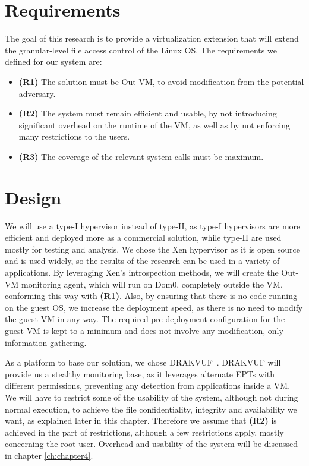 \section{Requirements}\label{sec:requirements}
The goal of this research is to provide a virtualization extension that will extend the granular-level file access control of the Linux \ac{OS}. The requirements we defined for our system are:
\begin{itemize}
	\item \textbf{(R1)} The solution must be Out-VM, to avoid modification from the potential adversary. 
	\item \textbf{(R2)} The system must remain efficient and usable, by not introducing significant overhead on the runtime of the \ac{VM}, as well as by not enforcing many restrictions to the users. 
	\item \textbf{(R3)} The coverage of the relevant system calls must be maximum.
\end{itemize}


\section{Design}\label{sec:design}

\par We will use a type-I hypervisor instead of type-II, as type-I hypervisors are more efficient and deployed more as a commercial solution, while type-II are used mostly for testing and analysis. We chose the Xen hypervisor as it is open source and is used widely, so the results of the research can be used in a variety of applications. By leveraging Xen's introspection methods, we will create the Out-VM monitoring agent, which will run on Dom0, completely outside the \ac{VM}, conforming this way with \textbf{(R1)}. Also, by ensuring that there is no code running on the guest \ac{OS}, we increase the deployment speed, as there is no need to modify the guest \ac{VM} in any way. The required pre-deployment configuration for the guest \ac{VM} is kept to a minimum and does not involve any modification, only information gathering.

\par As a platform to base our solution, we chose DRAKVUF~\cite{lengyel2014drakvuf}. DRAKVUF will provide us a stealthy monitoring base, as it leverages alternate \ac{EPT}s with different permissions, preventing any detection from applications inside a \ac{VM}. We will have to restrict some of the usability of the system, although not during normal execution, to achieve the file confidentiality, integrity and availability we want, as explained later in this chapter. Therefore we assume that \textbf{(R2)} is achieved in the part of restrictions, although a few restrictions apply, mostly concerning the root user. Overhead and usability of the system will be discussed in chapter \ref{ch:chapter4}.

